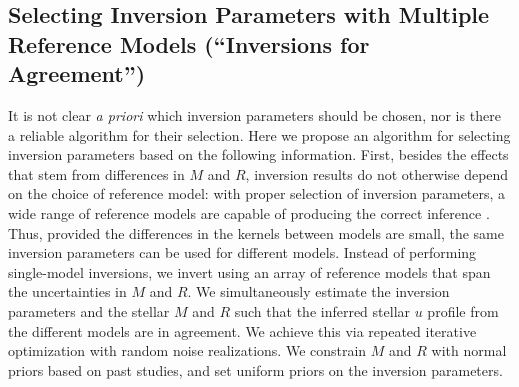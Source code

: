 %
%
%
\subsection{Selecting Inversion Parameters with Multiple Reference Models (``Inversions for Agreement'')} 
\label{sec:inversion-for-agreement}
It is not clear \emph{a priori} which inversion parameters should be chosen, nor is there a reliable algorithm for their selection. 
Here we propose an algorithm for selecting inversion parameters based on the following information. 
First, besides the effects that stem from differences in $M$ and $R$, inversion results do not otherwise depend on the choice of reference model: with proper selection of inversion parameters, a wide range of reference models are capable of producing the correct inference \citep{2000ApJ...529.1084B}. 
Thus, provided the differences in the kernels between models are small, the same inversion parameters can be used for different models. 
Instead of performing single-model inversions, we invert using an array of reference models that span the uncertainties in $M$ and $R$. 
We simultaneously estimate the inversion parameters and the stellar $M$ and $R$ such that the inferred stellar $u$ profile from the different models are in agreement. 
We achieve this via repeated iterative optimization with random noise realizations. 
We constrain $M$ and $R$ with normal priors based on past studies, and set uniform priors on the inversion parameters. 
%
%


